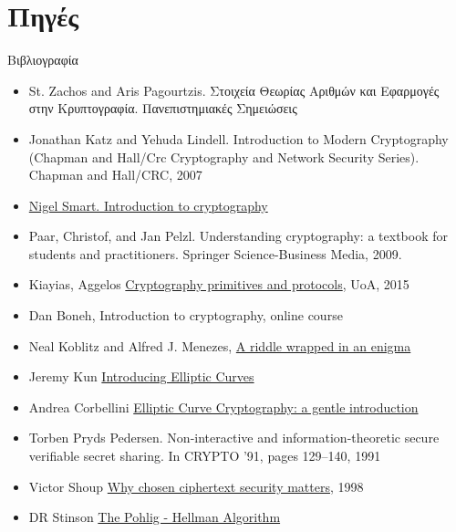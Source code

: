 \documentclass[handout]{beamer}
\begin{document}
\section{Πηγές}
\begin{frame}[allowframebreaks]{Βιβλιογραφία}
\begin{tiny}
\begin{itemize}
\item St. Zachos and Aris Pagourtzis. Στοιχεία Θεωρίας Αριθμών και Εφαρμογές στην Κρυπτογραφία. Πανεπιστημιακές Σημειώσεις
\item Jonathan Katz and Yehuda Lindell. Introduction to Modern Cryptography (Chapman and Hall/Crc Cryptography and Network Security Series). Chapman
and Hall/CRC, 2007
\item \href{http://goo.gl/b75I29}{Nigel Smart. Introduction to cryptography} 
\item Paar, Christof, and Jan Pelzl. Understanding cryptography: a textbook for students and practitioners. Springer Science-Business Media, 2009.
\item Kiayias, Aggelos  \href{http://crypto.di.uoa.gr/class/Kryptographia/Semeioseis_files/Cryptograph_Primitives_and_Protocols.pdf}{Cryptography primitives and protocols}, UoA, 2015
\item Dan Boneh, Introduction to cryptography, online course
\medskip
\item Neal Koblitz and Alfred J. Menezes, \href{http://eprint.iacr.org/2015/1018.pdf}{A riddle wrapped in an enigma} 
\item Jeremy Kun \href{http://jeremykun.com/2014/02/08/introducing-elliptic-curves/}{Introducing Elliptic Curves}
\item Andrea Corbellini \href{http://andrea.corbellini.name/2015/05/17/elliptic-curve-cryptography-a-gentle-introduction/}{Elliptic Curve Cryptography: a gentle introduction}
\item Torben Pryds Pedersen. Non-interactive and information-theoretic secure verifiable secret sharing. In CRYPTO ’91, pages 129–140, 1991
\item Victor Shoup \href{http://www.shoup.net/papers/expo.pdf}{Why chosen ciphertext security matters}, 1998
\item DR Stinson  
\href{http://anh.cs.luc.edu/331/notes/PohligHellmanp_k2p.pdf}{The Pohlig - Hellman Algorithm}
\end{itemize}
\end{tiny}
\end{frame}

 
\end{document}
